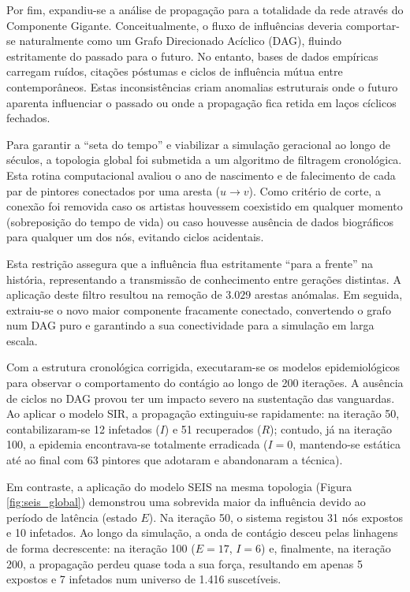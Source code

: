 \documentclass[12pt,a4paper]{article}
\begin{document}
Por fim, expandiu-se a análise de propagação para a totalidade da rede através do Componente Gigante. Conceitualmente, o fluxo de influências deveria comportar-se naturalmente como um Grafo Direcionado Acíclico (DAG), fluindo estritamente do passado para o futuro. No entanto, bases de dados empíricas carregam ruídos, citações póstumas e ciclos de influência mútua entre contemporâneos. Estas inconsistências criam anomalias estruturais onde o futuro aparenta influenciar o passado ou onde a propagação fica retida em laços cíclicos fechados.

Para garantir a ``seta do tempo'' e viabilizar a simulação geracional ao longo de séculos, a topologia global foi submetida a um algoritmo de filtragem cronológica. Esta rotina computacional avaliou o ano de nascimento e de falecimento de cada par de pintores conectados por uma aresta ($u \to v$). Como critério de corte, a conexão foi removida caso os artistas houvessem coexistido em qualquer momento (sobreposição do tempo de vida) ou caso houvesse ausência de dados biográficos para qualquer um dos nós, evitando ciclos acidentais.

Esta restrição assegura que a influência flua estritamente ``para a frente'' na história, representando a transmissão de conhecimento entre gerações distintas. A aplicação deste filtro resultou na remoção de $3.029$ arestas anómalas. Em seguida, extraiu-se o novo maior componente fracamente conectado, convertendo o grafo num DAG puro e garantindo a sua conectividade para a simulação em larga escala.

Com a estrutura cronológica corrigida, executaram-se os modelos epidemiológicos para observar o comportamento do contágio ao longo de 200 iterações. A ausência de ciclos no DAG provou ter um impacto severo na sustentação das vanguardas. Ao aplicar o modelo SIR, a propagação extinguiu-se rapidamente: na iteração 50, contabilizaram-se 12 infetados ($I$) e 51 recuperados ($R$); contudo, já na iteração 100, a epidemia encontrava-se totalmente erradicada ($I = 0$, mantendo-se estática até ao final com 63 pintores que adotaram e abandonaram a técnica).

Em contraste, a aplicação do modelo SEIS na mesma topologia (Figura \ref{fig:seis_global}) demonstrou uma sobrevida maior da influência devido ao período de latência (estado $E$). Na iteração 50, o sistema registou 31 nós expostos e 10 infetados. Ao longo da simulação, a onda de contágio desceu pelas linhagens de forma decrescente: na iteração 100 ($E = 17$, $I = 6$) e, finalmente, na iteração 200, a propagação perdeu quase toda a sua força, resultando em apenas 5 expostos e 7 infetados num universo de 1.416 suscetíveis.
\end{document}
